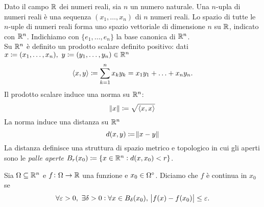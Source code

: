 
\begin{definition}[$ \R^n $]
	Dato il campo $ \R $ dei numeri reali, sia $ n $ un numero naturale. Una $ n $-upla di numeri reali è una sequenza $ (x_1, \ldots, x_n) $ di $ n $ numeri reali. Lo spazio di tutte le $ n $-uple di numeri reali forma uno spazio vettoriale di dimensione $ n $ su $ \R $, indicato con $ \R^n $. Indichiamo con $ \{e_1, \ldots, e_n\} $ la base canonica di $ \R^n $. \\
	Su $ \R^n $ è definito un prodotto scalare definito positivo: dati $ x \coloneqq (x_1, \ldots, x_n), \ y \coloneqq (y_1, \ldots, y_n) \in \R^n $ 
	\begin{equation}
		\sp{x}{y} \coloneqq \sum_{k = 1}^{n} x_k y_k = x_1 y_1 + \ldots + x_ny_n.
	\end{equation}
	Il prodotto scalare induce una norma su $ \R^n $:  
	\begin{equation}
		\norm{x} \coloneqq \sqrt{\sp{x}{x}} 
	\end{equation}
	La norma induce una distanza su $ \R^n $
	\begin{equation}
		d(x, y) \coloneqq \norm{x - y}
	\end{equation}
	La distanza definisce una struttura di spazio metrico e topologico in cui gli aperti sono le \emph{palle aperte} $ B_{r}(x_0) \coloneqq \{x \in \R^n : d(x, x_0) < r\} $.
\end{definition}

\begin{definition}
	Sia $ \Omega \subseteq \R^n $ e $ f \colon \Omega \to \R $ una funzione e $ x_0 \in \ouv{\Omega} $. Diciamo che $ f $ è continua in $ x_0 $ se 
	\begin{equation*}
		\forall \epsilon > 0, \ \exists \delta > 0 : \forall x \in B_\delta(x_0), \ \abs{f(x) - f(x_0)} \leq \epsilon.
	\end{equation*}
\end{definition}


